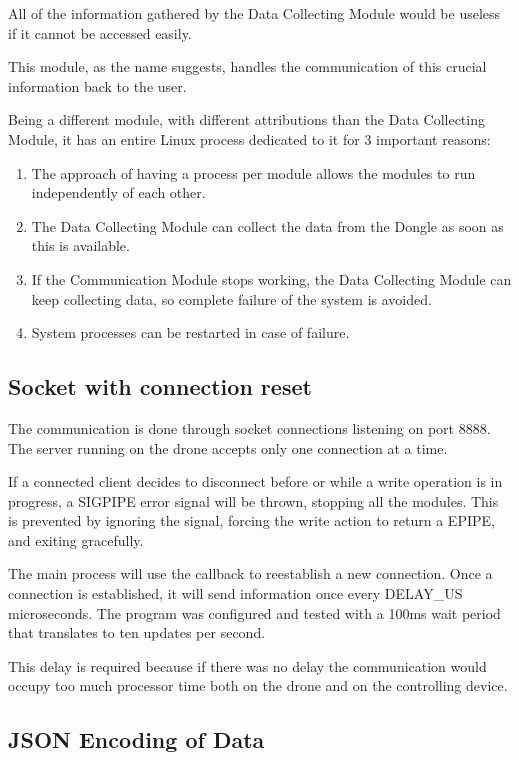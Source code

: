 All of the information gathered by the Data Collecting Module would be useless if it cannot be accessed easily.

This module, as the name suggests, handles the communication of this crucial information back to the user.

Being a different module, with different attributions than the Data Collecting Module, it has an entire Linux process dedicated to it for 3 important reasons:
\begin{enumerate}

\item The approach of having a process per module allows the modules to run independently of each other.
\item The Data Collecting Module can collect the data from the Dongle as soon as this is available.
\item If the Communication Module stops working, the Data Collecting Module can keep collecting data, so complete failure of the system is avoided.
\item System processes can be restarted in case of failure.

\end{enumerate}

\subsection{Socket with connection reset}

The communication is done through socket connections listening on port 8888. The server running on the drone accepts only one connection at a time.

If a connected client decides to disconnect before or while a write operation is in progress, a SIGPIPE error signal will be thrown, stopping all the modules. This is prevented by ignoring the signal, forcing the write action to return a EPIPE, and exiting gracefully.

The main process will use the callback  to reestablish a new connection. Once a connection is established, it will send information once every DELAY\_US microseconds. The program was configured and tested with a 100ms wait period that translates to ten updates per second.

This delay is required because if there was no delay the communication would occupy too much processor time both on the drone and on the controlling device.

\subsection{JSON Encoding of Data}

